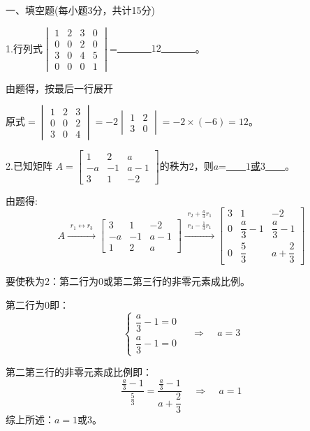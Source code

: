 \documentclass{article}
\begin{document}
一、填空题(每小题3分，共计15分)

1.行列式$
\begin{vmatrix}
  1 & 2 & 3 & 0\\
  0 & 0 & 2 & 0\\
  3 & 0 & 4 & 5\\
  0 & 0 & 0 &1
\end{vmatrix}
$=\underline{~~~~~~~\textcolor[rgb]{1.00,0.00,0.00}{$12$}~~~~~~~}。

\begin{jie}
由题得，按最后一行展开

原式$=
\begin{vmatrix}
  1 & 2 & 3 \\
  0 & 0 & 2 \\
  3 & 0 & 4
\end{vmatrix}
=-2
\begin{vmatrix}
  1 & 2  \\
  3 & 0
\end{vmatrix}
=-2\times(-6)=12$。
\end{jie}

2.已知矩阵
$
A=\begin{bmatrix}
    1 & 2 &a\\
    -a & -1 &a-1\\
    3& 1 & -2
  \end{bmatrix}
$的秩为2，则$a$=\underline{~~~~\textcolor[rgb]{1.00,0.00,0.00}{$1$或$3$}~~~~}。

\begin{jie}
由题得:
\begin{equation*}
A\xrightarrow{\substack{ r_1 \leftrightarrow r_3 }}
{
\begin{bmatrix}
 3& 1 & -2\\
    -a & -1 &a-1\\
    1 & 2 &a
  \end{bmatrix}
}\xrightarrow{\substack{ r_2+\frac{a}{3}r_1 \\ r_3 - \frac{1}{3}r_1 }}
{
\begin{bmatrix}
 3& 1 & -2\\%
    0 & \dfrac{a}{3}-1 &\dfrac{a}{3}-1\\
    0 & \dfrac{5}{3} &a+\dfrac{2}{3}
  \end{bmatrix}
}
\end{equation*}

要使秩为2：第二行为0或第二第三行的非零元素成比例。

第二行为0即：
\begin{equation*}
  \begin{cases}
\dfrac{a}{3}-1=0\\
\dfrac{a}{3}-1=0
  \end{cases}~~~~~\Rightarrow~~~~~
  a=3
\end{equation*}

第二第三行的非零元素成比例即：
\begin{equation}
\dfrac{\frac{a}{3}-1}{\frac{5}{3}}=\dfrac{\frac{a}{3}-1}{a+\dfrac{2}{3}}~~~~~\Rightarrow~~~~~a=1
\end{equation}
综上所述：$a=1$或$3$。
\end{jie}
\end{document}
